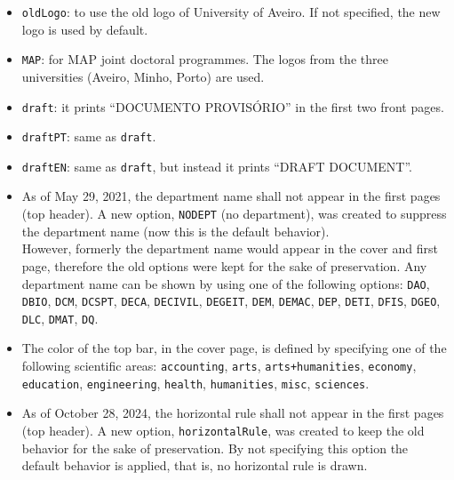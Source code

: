 \begin{itemize}

\item
\texttt{oldLogo}: to use the old logo of University of Aveiro. If not specified, the new logo is used by default.

\item
\texttt{MAP}: for MAP joint doctoral programmes. The logos from the three universities (Aveiro, Minho, Porto) are used.

\item
\texttt{draft}: it prints ``DOCUMENTO PROVISÓRIO'' in the first two front pages.

\item
\texttt{draftPT}: same as \texttt{draft}.

\item
\texttt{draftEN}: same as \texttt{draft}, but instead it prints ``DRAFT DOCUMENT''.

\item
As of May 29, 2021, the department name shall not appear in the first pages (top header).
A new option, \texttt{NODEPT} (no department), was created to suppress the department name (now this is the default behavior).\\
However, formerly the department name would appear in the cover and first page, therefore the old options were kept for the sake of preservation.
Any department name can be shown by using one of the following options: \texttt{DAO}, \texttt{DBIO}, \texttt{DCM}, \texttt{DCSPT}, \texttt{DECA}, \texttt{DECIVIL}, \texttt{DEGEIT}, \texttt{DEM}, \texttt{DEMAC}, \texttt{DEP}, \texttt{DETI}, \texttt{DFIS}, \texttt{DGEO}, \texttt{DLC}, \texttt{DMAT}, \texttt{DQ}.

\item
The color of the top bar, in the cover page, is defined by specifying one of the following scientific areas: \texttt{accounting}, \texttt{arts}, \texttt{arts+humanities}, \texttt{economy}, \texttt{education}, \texttt{engineering}, \texttt{health}, \texttt{humanities}, \texttt{misc}, \texttt{sciences}.

\item
As of October 28, 2024, the horizontal rule shall not appear in the first pages (top header).
A new option, \texttt{horizontalRule}, was created to keep the old behavior for the sake of preservation. By not specifying this option the default behavior is applied, that is, no horizontal rule is drawn.

\end{itemize}
